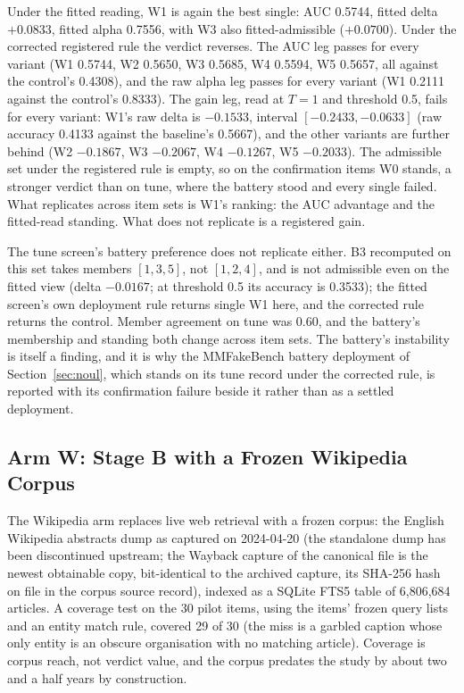 \documentclass{article} %
\begin{document}
Under the fitted reading, W1 is again the best single: AUC 0.5744, fitted delta \(+0.0833\), fitted alpha 0.7556, with W3 also fitted-admissible (\(+0.0700\)). Under the corrected registered rule the verdict reverses. The AUC leg passes for every variant (W1 0.5744, W2 0.5650, W3 0.5685, W4 0.5594, W5 0.5657, all against the control's 0.4308), and the raw alpha leg passes for every variant (W1 0.2111 against the control's 0.8333). The gain leg, read at \(T=1\) and threshold 0.5, fails for every variant: W1's raw delta is \(-0.1533\), interval \([-0.2433, -0.0633]\) (raw accuracy 0.4133 against the baseline's 0.5667), and the other variants are further behind (W2 \(-0.1867\), W3 \(-0.2067\), W4 \(-0.1267\), W5 \(-0.2033\)). The admissible set under the registered rule is empty, so on the confirmation items W0 stands, a stronger verdict than on tune, where the battery stood and every single failed. What replicates across item sets is W1's ranking: the AUC advantage and the fitted-read standing. What does not replicate is a registered gain.

The tune screen's battery preference does not replicate either. B3 recomputed on this set takes members \([1, 3, 5]\), not \([1, 2, 4]\), and is not admissible even on the fitted view (delta \(-0.0167\); at threshold 0.5 its accuracy is 0.3533); the fitted screen's own deployment rule returns single W1 here, and the corrected rule returns the control. Member agreement on tune was 0.60, and the battery's membership and standing both change across item sets. The battery's instability is itself a finding, and it is why the MMFakeBench battery deployment of Section~\ref{sec:noul}, which stands on its tune record under the corrected rule, is reported with its confirmation failure beside it rather than as a settled deployment.

\subsection{Arm W: Stage B with a Frozen Wikipedia Corpus}
The Wikipedia arm replaces live web retrieval with a frozen corpus: the English Wikipedia abstracts dump as captured on 2024-04-20 (the standalone dump has been discontinued upstream; the Wayback capture of the canonical file is the newest obtainable copy, bit-identical to the archived capture, its SHA-256 hash on file in the corpus source record), indexed as a SQLite FTS5 table of 6,806,684 articles. A coverage test on the 30 pilot items, using the items' frozen query lists and an entity match rule, covered 29 of 30 (the miss is a garbled caption whose only entity is an obscure organisation with no matching article). Coverage is corpus reach, not verdict value, and the corpus predates the study by about two and a half years by construction.
\end{document}
